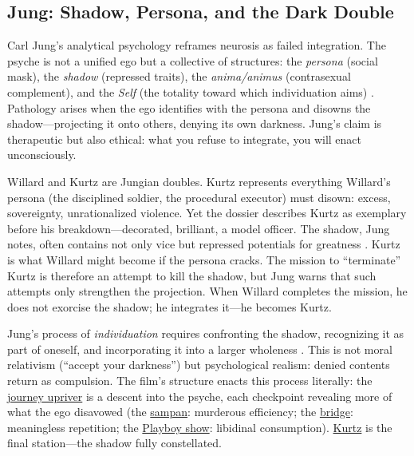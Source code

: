 \subsection*{Jung: Shadow, Persona, and the Dark Double}
\label{ssec:vi-jung}

Carl Jung's analytical psychology reframes neurosis as failed integration. The psyche is not a
unified ego but a collective of structures: the \emph{persona} (social mask), the
\emph{shadow} (repressed traits), the \emph{anima/animus} (contrasexual complement), and the
\emph{Self} (the totality toward which individuation aims) \parencite{JungArchetypes1969}.
Pathology arises when the ego identifies with the persona and disowns the shadow---projecting
it onto others, denying its own darkness. Jung's claim is therapeutic but also ethical: what
you refuse to integrate, you will enact unconsciously.

Willard and Kurtz are Jungian doubles. Kurtz represents everything Willard's persona (the
disciplined soldier, the procedural executor) must disown: excess, sovereignty,
unrationalized violence. Yet the dossier describes Kurtz as exemplary before his
breakdown---decorated, brilliant, a model officer. The shadow, Jung notes, often contains not
only vice but repressed potentials for greatness \parencite{JungArchetypes1969}. Kurtz is what
Willard might become if the persona cracks. The mission to ``terminate'' Kurtz is therefore an
attempt to kill the shadow, but Jung warns that such attempts only strengthen the projection.
When Willard completes the mission, he does not exorcise the shadow; he integrates it---he
becomes Kurtz.

Jung's process of \emph{individuation} requires confronting the shadow, recognizing it as part
of oneself, and incorporating it into a larger wholeness \parencite{JungArchetypes1969}. This
is not moral relativism (``accept your darkness'') but psychological realism: denied contents
return as compulsion. The film's structure enacts this process literally: the
\hyperref[scene:upriver-journey]{journey upriver} is a descent into the psyche, each checkpoint
revealing more of what the ego disavowed (the
\hyperref[scene:sampan]{sampan}: murderous efficiency; the
\hyperref[scene:do-lung-bridge]{bridge}: meaningless repetition; the
\hyperref[scene:playboy-show]{Playboy show}: libidinal consumption).
\hyperref[scene:kurtz-compound]{Kurtz} is the final station---the shadow fully constellated.


